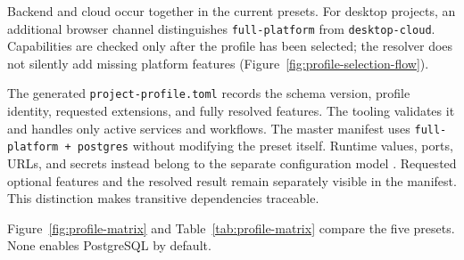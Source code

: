 Backend and cloud occur together in the current presets. For desktop projects,
an additional browser channel distinguishes \texttt{full-platform} from
\texttt{desktop-cloud}. Capabilities are checked only after the profile has
been selected; the resolver does not silently add missing platform features
(Figure~\ref{fig:profile-selection-flow}).



The generated \texttt{project-profile.toml} records the schema version,
profile identity, requested extensions, and fully resolved features. The
tooling validates it and handles only active services and workflows. The
master manifest uses \texttt{full-platform + postgres} without modifying the
preset itself. Runtime values, ports, URLs, and secrets instead belong to the
separate configuration model
\parencite{kleiveist2026configuration,kleiveist2026governance-snapshot}.
Requested optional features and the resolved result remain separately visible
in the manifest. This distinction makes transitive dependencies traceable.

Figure~\ref{fig:profile-matrix} and Table~\ref{tab:profile-matrix} compare the
five presets. None enables PostgreSQL by default.



